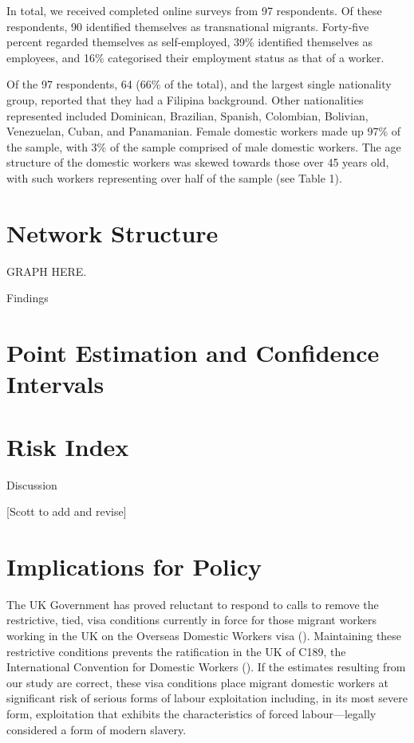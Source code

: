 \documentclass[
  12pt,
  letterpaper,
  DIV=11,
  numbers=noendperiod]{scrartcl}
\theoremstyle{plain}
\theoremstyle{definition}
\begin{document}
In total, we received completed online surveys from 97 respondents. Of
these respondents, 90 identified themselves as transnational migrants.
Forty-five percent regarded themselves as self-employed, 39\% identified
themselves as employees, and 16\% categorised their employment status as
that of a worker.

Of the 97 respondents, 64 (66\% of the total), and the largest single
nationality group, reported that they had a Filipina background. Other
nationalities represented included Dominican, Brazilian, Spanish,
Colombian, Bolivian, Venezuelan, Cuban, and Panamanian. Female domestic
workers made up 97\% of the sample, with 3\% of the sample comprised of
male domestic workers. The age structure of the domestic workers was
skewed towards those over 45 years old, with such workers representing
over half of the sample (see Table 1).

\section{Network Structure}\label{network-structure}

GRAPH HERE.

Findings

\section{Point Estimation and Confidence
Intervals}\label{point-estimation-and-confidence-intervals}

\section{Risk Index}\label{risk-index}

Discussion

{[}Scott to add and revise{]}

\section{Implications for Policy}\label{implications-for-policy}

The UK Government has proved reluctant to respond to calls to remove the
restrictive, tied, visa conditions currently in force for those migrant
workers working in the UK on the Overseas Domestic Workers visa
(\textcite{gower_calls_2016}). Maintaining these restrictive conditions
prevents the ratification in the UK of C189, the International
Convention for Domestic Workers (\textcite{ILO11-indicators}). If the
estimates resulting from our study are correct, these visa conditions
place migrant domestic workers at significant risk of serious forms of
labour exploitation including, in its most severe form, exploitation
that exhibits the characteristics of forced labour---legally considered
a form of modern slavery.
\end{document}
